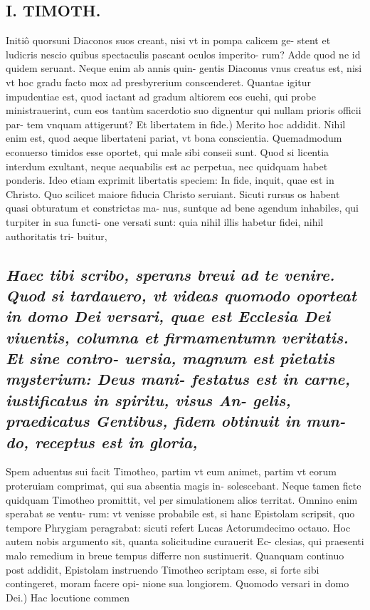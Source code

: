 \documentclass{article}
\begin{document}
\begin{pages}
\section*{I. TIMOTH. }
\marginpar{[ p.38 ]}\pstart Initiô quorsuni Diaconos suos creant, nisi vt in pompa calicem ge- stent et ludicris nescio quibus spectaculis pascant oculos imperito- rum? Adde quod ne id quidem seruant. Neque enim ab annis quin- gentis Diaconus vnus creatus est, nisi vt hoc gradu facto mox ad presbyrerium conscenderet. Quantae igitur impudentiae est, quod iactant ad gradum altiorem eos euehi, qui probe ministrauerint, cum eos tantùm sacerdotio suo dignentur qui nullam prioris officii par- tem vnquam attigerunt?  \pend\pstart Et libertatem in fide.) Merito hoc addidit. Nihil enim est, quod aeque libertateni pariat, vt bona conscientia. Quemadmodum econuerso timidos esse oportet, qui male sibi conseii sunt. Quod si licentia interdum exultant, neque aequabilis est ac perpetua, nec quidquam habet ponderis. Ideo etiam exprimit libertatis speciem: In fide, inquit, quae est in Christo. Quo scilicet maiore fiducia Christo seruiant. Sicuti rursus os habent quasi obturatum et constrictas ma- nus, suntque ad bene agendum inhabiles, qui turpiter in sua functi- one versati sunt: quia nihil illis habetur fidei, nihil authoritatis tri- buitur,  \pend
{}
{}
\subsection*{\textit{Haec tibi scribo, sperans breui ad te venire. Quod si tardauero, vt videas quomodo oporteat in domo Dei versari, quae est Ecclesia Dei viuentis, columna et firmamentumn veritatis. Et sine contro- uersia, magnum est pietatis mysterium: Deus mani- festatus est in carne, iustificatus in spiritu, visus An- gelis, praedicatus Gentibus, fidem obtinuit in mun- do, receptus est in gloria, }}\pstart Spem aduentus sui facit Timotheo, partim vt eum animet, partim vt eorum proteruiam comprimat, qui sua absentia magis in- solescebant. Neque tamen ficte quidquam Timotheo promittit, vel per simulationem alios territat. Omnino enim sperabat se ventu- rum: vt venisse probabile est, si hanc Epistolam scripsit, quo tempore Phrygiam peragrabat: sicuti refert Lucas Actorumdecimo octauo. Hoc autem nobis argumento sit, quanta solicitudine curauerit Ec- clesias, qui praesenti malo remedium in breue tempus differre non sustinuerit. Quanquam continuo post addidit, Epistolam instruendo Timotheo scriptam esse, si forte sibi contingeret, moram facere opi- nione sua longiorem.  \pend\pstart Quomodo versari in domo Dei.) Hac locutione commen  \pend

\end{pages}
\end{document}
